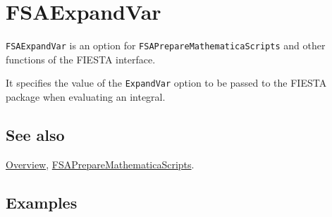 \documentclass[../FeynHelpersManual.tex]{subfiles}
\begin{document}
\begin{Shaded}
\begin{Highlighting}[]
 
\end{Highlighting}
\end{Shaded}

\hypertarget{fsaexpandvar}{
\section{FSAExpandVar}\label{fsaexpandvar}}

\texttt{FSAExpandVar} is an option for
\texttt{FSAPrepareMathematicaScripts} and other functions of the FIESTA
interface.

It specifies the value of the \texttt{ExpandVar} option to be passed to
the FIESTA package when evaluating an integral.

\subsection{See also}

\hyperlink{toc}{Overview},
\hyperlink{fsapreparemathematicascripts}{FSAPrepareMathematicaScripts}.

\subsection{Examples}
\end{document}
